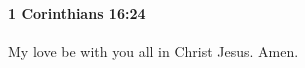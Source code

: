 		\paragraph{1 Corinthians 16:24} %
			\label{1CORINTHIANS-16-24}

			My love be with you all in Christ Jesus.  Amen.

			\begin{framed}
				\scriptsize
				\begin{compactdesc}
					\item[SBLG] 
				\end{compactdesc}
			\end{framed}